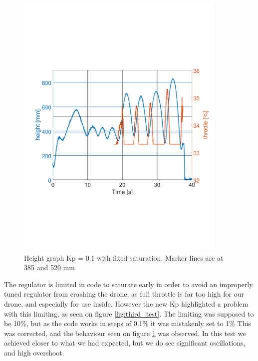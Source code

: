 \begin{figure}[h]
    \centering
    \includegraphics[width=0.9\textwidth, trim={0 7cm 0 7cm},clip]{figures/Appendix/final_test/kp0,1fix.pdf}
    \caption{Height graph Kp = 0.1 with fixed saturation. Marker lines are at 385 and 520 mm}
    \label{fig:fourth_test}
\end{figure}


The regulator is limited in code to saturate early in order to avoid an improperly tuned regulator from crashing the drone, as full throttle is far too high for our drone, and especially for use inside. However the new Kp highlighted a problem with this limiting, as seen on figure \ref{fig:third_test}. The limiting was supposed to be 10\%, but as the code works in steps of 0.1\% it was mistakenly set to 1\% This was corrected, and the behaviour seen on figure \ref{fig:fourth_test} was observed. In this test we achieved closer to what we had expected, but we do see significant oscillations, and high overshoot.